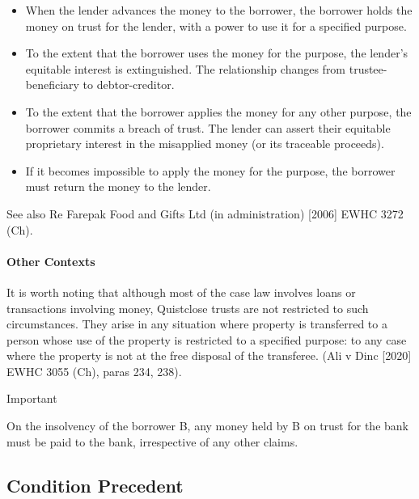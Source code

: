 \documentclass[
]{article}
\providecommand{\tightlist}{%
  \setlength{\itemsep}{0pt}\setlength{\parskip}{0pt}}
\newenvironment{env-d797b130-4ec5-4d02-9c44-4f2a86698248}
{
    \savenotes\tcolorbox[blanker,breakable,left=5pt,borderline west={2pt}{-4pt}{cyan}]
}
{
    \endtcolorbox\spewnotes
}
\begin{document}
\begin{itemize}
\tightlist
\item
  When the lender advances the money to the borrower, the borrower holds
  the money on trust for the lender, with a power to use it for a
  specified purpose.
\item
  To the extent that the borrower uses the money for the purpose, the
  lender's equitable interest is extinguished. The relationship changes
  from trustee-beneficiary to debtor-creditor.
\item
  To the extent that the borrower applies the money for any other
  purpose, the borrower commits a breach of trust. The lender can assert
  their equitable proprietary interest in the misapplied money (or its
  traceable proceeds).
\item
  If it becomes impossible to apply the money for the purpose, the
  borrower must return the money to the lender.
\end{itemize}

See also Re Farepak Food and Gifts Ltd (in administration) {[}2006{]}
EWHC 3272 (Ch).

\hypertarget{other-contexts}{%
\paragraph{Other Contexts}\label{other-contexts}}

It is worth noting that although most of the case law involves loans or
transactions involving money, Quistclose trusts are not restricted to
such circumstances. They arise in any situation where property is
transferred to a person whose use of the property is restricted to a
specified purpose: to any case where the property is not at the free
disposal of the transferee. (Ali v Dinc {[}2020{]} EWHC 3055 (Ch), paras
234, 238).

\begin{env-d797b130-4ec5-4d02-9c44-4f2a86698248}

Important

On the insolvency of the borrower B, any money held by B on trust for
the bank must be paid to the bank, irrespective of any other claims.

\end{env-d797b130-4ec5-4d02-9c44-4f2a86698248}

\hypertarget{condition-precedent}{%
\subsection{Condition Precedent}\label{condition-precedent}}
\end{document}
